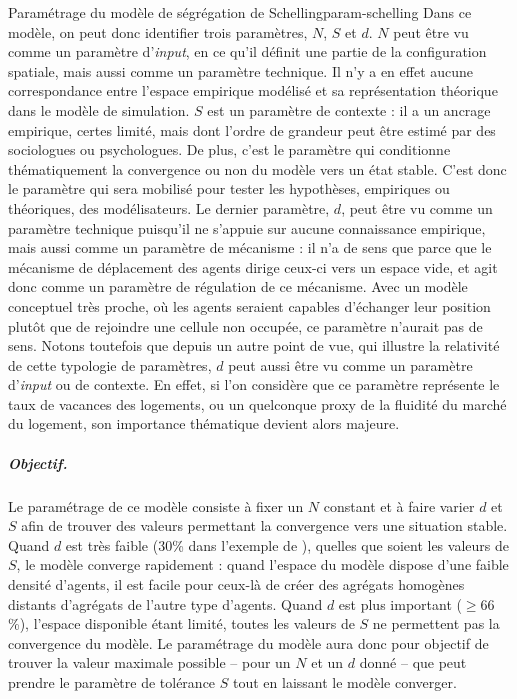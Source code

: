 \begin{encadre}{Paramétrage du modèle de ségrégation de Schelling}{param-schelling}
Dans ce modèle, on peut donc identifier trois paramètres, $N$, $S$ et $d$.
$N$ peut être vu comme un paramètre d'\textit{input}, en ce qu'il définit une partie de la configuration spatiale, mais aussi comme un paramètre technique.
Il n'y a en effet aucune correspondance entre l'espace empirique modélisé et
sa représentation théorique dans le modèle de simulation.
$S$ est un paramètre de contexte : il a un ancrage empirique, certes limité, mais dont l'ordre de grandeur peut être estimé par des sociologues ou psychologues.
De plus, c'est le paramètre qui conditionne thématiquement la convergence ou non du modèle vers un état stable.
C'est donc le paramètre qui sera mobilisé pour tester les hypothèses, empiriques ou théoriques, des modélisateurs.
Le dernier paramètre, $d$, peut être vu comme un paramètre technique puisqu'il ne s'appuie sur aucune connaissance empirique, mais aussi comme un paramètre de mécanisme : il n'a de sens que parce que le mécanisme de déplacement des agents dirige ceux-ci vers un \og espace vide\fg{}, et agit donc comme un paramètre de régulation de ce mécanisme.
Avec un modèle conceptuel très proche, où les agents seraient capables \og d'échanger\fg{} leur position plutôt que de rejoindre une cellule non occupée, ce paramètre n'aurait pas de sens.
Notons toutefois que depuis un autre point de vue, qui illustre la relativité de cette typologie de paramètres, $d$ peut aussi être vu comme un paramètre d'\textit{input} ou de contexte.
En effet, si l'on considère que ce paramètre représente le taux de vacances des logements, ou un quelconque proxy de la fluidité du marché du logement, son importance thématique devient alors majeure.

\subparagraph{Objectif.}
Le paramétrage de ce modèle consiste à fixer un $N$ constant et à faire varier $d$ et $S$ afin de trouver des valeurs permettant la convergence vers une situation stable.
Quand $d$ est très faible ($30$\% dans l'exemple de \textcite{daude_comparaison_2006}), quelles que soient les valeurs de $S$, le modèle converge rapidement :
	quand l'espace du modèle dispose d'une faible densité d'agents, il est facile pour ceux-là de créer des agrégats homogènes distants d'agrégats de l'autre type d'agents.
Quand $d$ est plus important ($\geq66$\%), l'espace disponible étant limité, toutes les valeurs de $S$ ne permettent pas la convergence du modèle.
Le paramétrage du modèle aura donc pour objectif de trouver la valeur maximale possible -- pour un $N$ et un $d$ donné -- que peut prendre le paramètre de tolérance $S$ tout en laissant le modèle converger.


\end{encadre}
